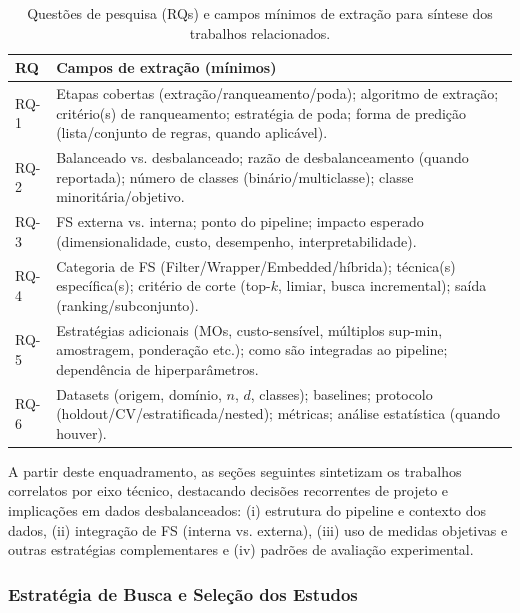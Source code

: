 \begin{table}[H]
\centering
\caption{Questões de pesquisa (RQs) e campos mínimos de extração para síntese dos trabalhos relacionados.}
\label{tab:rq_extracao}
\renewcommand{\arraystretch}{1.2}
\begin{tabular}{|p{2.1cm}|p{10.7cm}|}
\hline
\textbf{RQ} & \textbf{Campos de extração (mínimos)} \\
\hline
RQ-1 & Etapas cobertas (extração/ranqueamento/poda); algoritmo de extração; critério(s) de ranqueamento; estratégia de poda; forma de predição (lista/conjunto de regras, quando aplicável). \\
\hline
RQ-2 & Balanceado vs. desbalanceado; razão de desbalanceamento (quando reportada); número de classes (binário/multiclasse); classe minoritária/objetivo. \\
\hline
RQ-3 & FS externa vs. interna; ponto do pipeline; impacto esperado (dimensionalidade, custo, desempenho, interpretabilidade). \\
\hline
RQ-4 & Categoria de FS (Filter/Wrapper/Embedded/híbrida); técnica(s) específica(s); critério de corte (top-$k$, limiar, busca incremental); saída (ranking/subconjunto). \\
\hline
RQ-5 & Estratégias adicionais (MOs, custo-sensível, múltiplos sup-min, amostragem, ponderação etc.); como são integradas ao pipeline; dependência de hiperparâmetros. \\
\hline
RQ-6 & Datasets (origem, domínio, $n$, $d$, classes); baselines; protocolo (holdout/CV/estratificada/nested); métricas; análise estatística (quando houver). \\
\hline
\end{tabular}
\end{table}

\noindent A partir deste enquadramento, as seções seguintes sintetizam os trabalhos correlatos por eixo técnico, destacando decisões recorrentes de projeto e implicações em dados desbalanceados: (i) estrutura do pipeline e contexto dos dados, (ii) integração de FS (interna vs. externa), (iii) uso de medidas objetivas e outras estratégias complementares e (iv) padrões de avaliação experimental.


\subsubsection{Estratégia de Busca e Seleção dos Estudos}\label{sec:busca_selecao}

